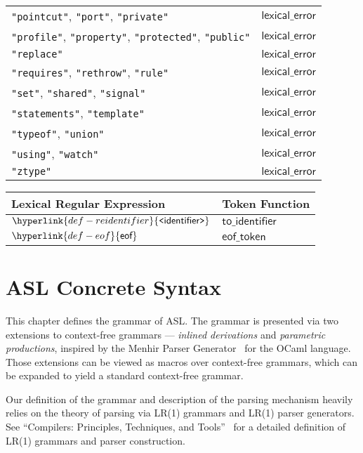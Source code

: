 \documentclass{book}
\newcommand\eof[0]{\hyperlink{def-eof}{\textsf{eof}}}
\newcommand\REidentifier[0]{\hyperlink{def-reidentifier}{\texttt{<}\textsf{identifier}\texttt{>}}}
\newcommand\lexicalerror[0]{\textsf{lexical\_error}}
\newcommand\toidentifier[0]{\textsf{to\_identifier}}
\newcommand\eoftoken[0]{\textsf{eof\_token}}
\begin{document}
\begin{center}
\begin{tabular}{ll}
\texttt{"pointcut"}, \texttt{"port"}, \texttt{"private"} & $\lexicalerror$ \\
\texttt{"profile"}, \texttt{"property"}, \texttt{"protected"}, \texttt{"public"} & $\lexicalerror$ \\
\texttt{"replace"} & $\lexicalerror$ \\
\texttt{"requires"}, \texttt{"rethrow"}, \texttt{"rule"} & $\lexicalerror$ \\
\texttt{"set"}, \texttt{"shared"}, \texttt{"signal"} & $\lexicalerror$ \\
\texttt{"statements"}, \texttt{"template"} & $\lexicalerror$ \\
\texttt{"typeof"}, \texttt{"union"} & $\lexicalerror$ \\
\texttt{"using"}, \texttt{"watch"} & $\lexicalerror$ \\
\texttt{"ztype"} & $\lexicalerror$ \\
\hline
\end{tabular}
\end{center}

\begin{center}
\begin{tabular}{ll}
\textbf{Lexical Regular Expression} & \textbf{Token Function}\\
\hline
$\REidentifier$   & $\toidentifier$ \\
$\eof$            & $\eoftoken$ \\
\hline
\end{tabular}
\end{center}

\chapter{ASL Concrete Syntax \label{chap:parsing}}

This chapter defines the grammar of ASL. The grammar is presented via two extensions
to context-free grammars --- \emph{inlined derivations} and \emph{parametric productions},
inspired by the Menhir Parser Generator~\cite{MenhirManual} for the OCaml language.
Those extensions can be viewed as macros over context-free grammars, which can be
expanded to yield a standard context-free grammar.

Our definition of the grammar and description of the parsing mechanism heavily relies
on the theory of parsing via LR(1) grammars and LR(1) parser generators.
%
See ``Compilers: Principles, Techniques, and Tools''~\cite{ASU86} for a detailed
definition of LR(1) grammars and parser construction.
\end{document}
